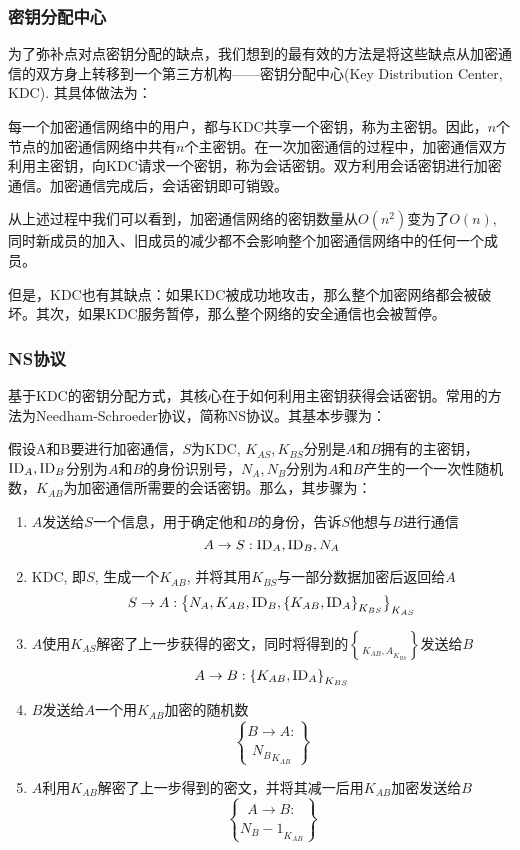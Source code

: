 \subsubsection{密钥分配中心}
为了弥补点对点密钥分配的缺点，我们想到的最有效的方法是将这些缺点从加密通信的双方身上转移到一个第三方机构——密钥分配中心(Key Distribution Center, KDC). 其具体做法为：\par
每一个加密通信网络中的用户，都与KDC共享一个密钥，称为主密钥。因此，$n$个节点的加密通信网络中共有$n$个主密钥。在一次加密通信的过程中，加密通信双方利用主密钥，向KDC请求一个密钥，称为会话密钥。双方利用会话密钥进行加密通信。加密通信完成后，会话密钥即可销毁。\par
从上述过程中我们可以看到，加密通信网络的密钥数量从$O(n^2)$变为了$O(n)$, 同时新成员的加入、旧成员的减少都不会影响整个加密通信网络中的任何一个成员。\par
但是，KDC也有其缺点：如果KDC被成功地攻击，那么整个加密网络都会被破坏。其次，如果KDC服务暂停，那么整个网络的安全通信也会被暂停。
\subsubsection{NS协议}
基于KDC的密钥分配方式，其核心在于如何利用主密钥获得会话密钥。常用的方法为Needham-Schroeder协议，简称NS协议。其基本步骤为：\par
假设A和B要进行加密通信，$S$为KDC, $K_{AS}, K_{BS}$分别是$A$和$B$拥有的主密钥，$\mathrm{ID}_A, \mathrm{ID}_B$分别为$A$和$B$的身份识别号，$N_A, N_B$分别为$A$和$B$产生的一个一次性随机数，$K_{AB}$为加密通信所需要的会话密钥。那么，其步骤为：
\begin{enumerate}
	\item $A$发送给$S$一个信息，用于确定他和$B$的身份，告诉$S$他想与$B$进行通信
	\[A\to S: \mathrm{ID}_A, \mathrm{ID}_B, N_A\]
	\item KDC, 即$S$, 生成一个$K_{AB}$, 并将其用$K_{BS}$与一部分数据加密后返回给$A$
	\[S\to A: \left\{ {N_A, K_{AB}, \mathrm{ID}_B, \left\{ {K_{AB}, \mathrm{ID}_A} \right\}_{K_{BS}}} \right\}_{K_{AS}}\]
	\item $A$使用$K_{AS}$解密了上一步获得的密文，同时将得到的$\brace{K_{AB}, A}_{K_{BS}}$发送给$B$
	\[A\to B: \left\{ {K_{AB}, \mathrm{ID}_A} \right\}_{K_{BS}}\]
	\item $B$发送给$A$一个用$K_{AB}$加密的随机数
	\[B\to A: \brace{N_B}_{K_{AB}}\]
	\item $A$利用$K_{AB}$解密了上一步得到的密文，并将其减一后用$K_{AB}$加密发送给$B$
	\[A\to B: \brace{N_B - 1}_{K_{AB}}\]
\end{enumerate}

